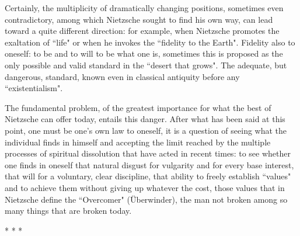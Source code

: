 Certainly, the multiplicity of dramatically changing positions, sometimes even contradictory, among which Nietzsche sought to find his own way, can lead toward a quite different direction: for example, when Nietzsche promotes the exaltation of ``life" or when he invokes the ``fidelity to the Earth". Fidelity also to oneself: to be and to will to be what one is, sometimes this is proposed as the only possible and valid standard in the ``desert that grows". The adequate, but dangerous, standard, known even in classical antiquity before any ``existentialism".

The fundamental problem, of the greatest importance for what the best of Nietzsche can offer today, entails this danger. After what has been said at this point, one must be one's own law to oneself, it is a question of seeing what the individual finds in himself and accepting the limit reached by the multiple processes of spiritual dissolution that have acted in recent times: to see whether one finds in oneself that natural disgust for vulgarity and for every base interest, that will for a voluntary, clear discipline, that ability to freely establish ``values" and to achieve them without giving up whatever the cost, those values that in Nietzsche define the ``Overcomer" (Überwinder), the man not broken among so many things that are broken today.




\begin{center}* * *\end{center}

